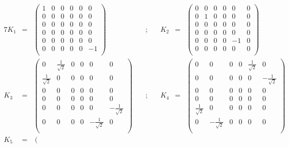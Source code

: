 \documentclass[10pt,a4paper]{article}
\begin{document}
\begin{table}[htb]
  \centering
  \begin{alignat*}{7}
   K_1 & =  &\left(
\begin{array}{cccccc}
 1 & 0 & 0 & 0 & 0 & 0 \\
 0 & 0 & 0 & 0 & 0 & 0 \\
 0 & 0 & 0 & 0 & 0 & 0 \\
 0 & 0 & 0 & 0 & 0 & 0 \\
 0 & 0 & 0 & 0 & 0 & 0 \\
 0 & 0 & 0 & 0 & 0 & -1 \\
\end{array}
\right) &\quad ;  \quad & K_2& =  &\left(
\begin{array}{cccccc}
 0 & 0 & 0 & 0 & 0 & 0 \\
 0 & 1 & 0 & 0 & 0 & 0 \\
 0 & 0 & 0 & 0 & 0 & 0 \\
 0 & 0 & 0 & 0 & 0 & 0 \\
 0 & 0 & 0 & 0 & -1 & 0 \\
 0 & 0 & 0 & 0 & 0 & 0 \\
\end{array}
\right) \nonumber\\
   K_3 & =  & \left(
\begin{array}{cccccc}
 0 & \frac{1}{\sqrt{2}} & 0 & 0 & 0 & 0 \\
 \frac{1}{\sqrt{2}} & 0 & 0 & 0 & 0 & 0 \\
 0 & 0 & 0 & 0 & 0 & 0 \\
 0 & 0 & 0 & 0 & 0 & 0 \\
 0 & 0 & 0 & 0 & 0 & -\frac{1}{\sqrt{2}} \\
 0 & 0 & 0 & 0 & -\frac{1}{\sqrt{2}} & 0 \\
\end{array}
\right) &\quad ;  \quad   & K_4& =  & \left(
\begin{array}{cccccc}
 0 & 0 & 0 & 0 & \frac{1}{\sqrt{2}} & 0 \\
 0 & 0 & 0 & 0 & 0 & -\frac{1}{\sqrt{2}} \\
 0 & 0 & 0 & 0 & 0 & 0 \\
 0 & 0 & 0 & 0 & 0 & 0 \\
 \frac{1}{\sqrt{2}} & 0 & 0 & 0 & 0 & 0 \\
 0 & -\frac{1}{\sqrt{2}} & 0 & 0 & 0 & 0 \\
\end{array}
\right) \nonumber\\
  K_5 & =  & \left(
\begin{array}{cccccc}

\end{array}
\end{alignat*}
\end{table}
\end{document}
